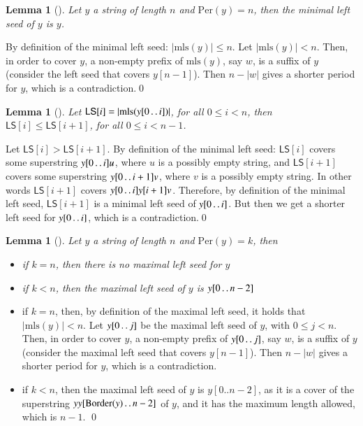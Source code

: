 \documentclass[preprint,12pt]{elsarticle}
\newcommand{\dd}{\mathinner{\ldotp\ldotp}}
\newcommand{\sarr}{\textsf{LS}}      %
\newcommand{\Border}[1]{\ensuremath{\mathrm{Border}(#1)}}
\newcommand{\Per}[1]{\ensuremath{\mathrm{Per}(#1)}}
\newcommand{\mls}[1]{\ensuremath{\mathrm{mls}(#1)}}
\newtheorem{lemma}[theorem]{Lemma}
\newenvironment{proof}[1][Proof]{\begin{trivlist}
\item[\hskip \labelsep {\bfseries #1}]}{\end{trivlist}}
\begin{document}
\begin{lemma}[\cite{cpm_2011}]
\label{lemma ls aperiodic}
Let $y$ a string of length $n$ and $\Per{y} = n$, then the minimal left seed of $y$ is $y$.
\end{lemma}
\begin{proof}
By definition of the minimal left seed: $|\mls{y}|\leq n$. Let $|\mls{y}| < n$. Then, in order to
cover $y$, a non-empty prefix of $\mls{y}$, say $w$, is a suffix of $y$ (consider the left seed that covers $y[n-1]$).
Then $n-|w|$ gives a shorter period for $y$, which is a contradiction.\qed
\end{proof}

\begin{lemma}[\cite{cpm_2011}]
\label{lemma LS[i]<=LS[i+1]}
Let $\sarr[i]=|\mls{y[0 \dd i]}|$, for all $0 \leq i < n$, then $\sarr[i] \leq \sarr[i+1]$, for all $0 \leq i < n-1$.
\end{lemma}
\begin{proof}
Let $\sarr[i] > \sarr[i+1]$. By definition of the minimal left seed: $\sarr[i]$ covers some superstring $y[0 \dd i]u$, where $u$ is a
possibly empty string, and $\sarr[i+1]$ covers some superstring $y[0 \dd i+1]v$, where $v$ is a possibly empty string.
In other words $\sarr[i+1]$ covers $y[0 \dd i]y[i+1]v$. Therefore, by definition of the minimal left seed, $\sarr[i+1]$ is a minimal left seed of $y[0 \dd i]$. But then we get a shorter left seed for $y[0 \dd i]$, which is a contradiction.\qed
\end{proof}

\begin{lemma}[\cite{cpm_2011}]
\label{lemma max ls}
Let $y$ a string of length $n$ and $\Per{y} = k$, then
\begin{itemize}
 \item if $k=n$, then there is no maximal left seed for $y$
 \item if $k<n$, then the maximal left seed of $y$ is $y[0\dd n-2]$
\end{itemize}
\end{lemma}
\begin{proof}
\begin{itemize}
 \item if $k=n$, then, by definition of the maximal left seed, it holds that $|\mls{y}| < n$. Let $y[0\dd j]$ be the maximal
left seed of $y$, with $0 \leq j < n$. Then, in order to cover $y$, a non-empty prefix of $y[0 \dd j]$, say $w$, 
is a suffix of $y$ (consider the maximal left seed that covers $y[n-1]$). Then $n-|w|$ gives a shorter period for $y$, which is a contradiction.
 \item if $k<n$, then the maximal left seed of $y$ is $y[0..n-2]$, as it is a cover of the superstring $yy[\Border{y}\dd n-2]$ of $y$,
and it has the maximum length allowed, which is $n-1$. \qed
\end{itemize}
\end{proof}
\end{document}
